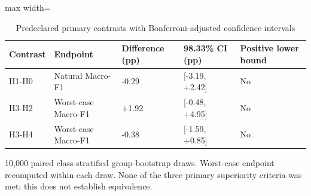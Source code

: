 \begin{table}[t]
\centering
\small
\caption{Predeclared primary contrasts with Bonferroni-adjusted confidence intervals}
\label{tab:09-primary-contrasts}
\begin{adjustbox}{max width=\textwidth}
\begin{tabular}{lllll}
\toprule
\textbf{Contrast} & \textbf{Endpoint} & \textbf{Difference (pp)} & \textbf{98.33\% CI (pp)} & \textbf{Positive lower bound} \\
\midrule
H1-H0 & Natural Macro-F1 & -0.29 & [-3.19, +2.42] & No \\
H3-H2 & Worst-case Macro-F1 & +1.92 & [-0.48, +4.95] & No \\
H3-H4 & Worst-case Macro-F1 & -0.38 & [-1.59, +0.85] & No \\
\bottomrule
\end{tabular}
\end{adjustbox}
\par\smallskip
\begin{minipage}{\textwidth}\footnotesize 10,000 paired class-stratified group-bootstrap draws. Worst-case endpoint recomputed within each draw. None of the three primary superiority criteria was met; this does not establish equivalence.\end{minipage}
\end{table}
